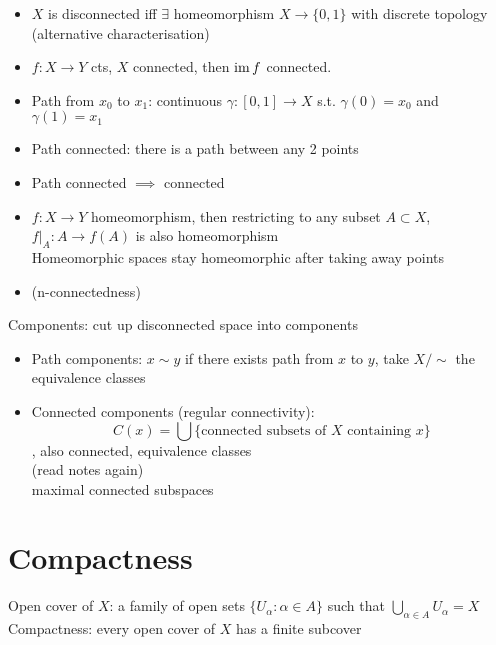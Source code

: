 \begin{itemize}
    \item $X$ is disconnected iff $\exists$ homeomorphism $X \to \{0,1\}$ with discrete topology \\ (alternative characterisation)
    \item $f: X \to Y$ cts, $X$ connected, then $\operatorname{im} f$ connected.
    \item Path from $x_0$ to $x_1$: continuous $\gamma: [0,1] \to X$ s.t. $\gamma(0) = x_0$ and $\gamma(1) = x_1$
    \item Path connected: there is a path between any 2 points
    \item Path connected $\implies$ connected
    \item $f: X \to Y$ homeomorphism, then restricting to any subset $A \subset X$, $f|_A: A \to f(A)$ is also homeomorphism \\ Homeomorphic spaces stay homeomorphic after taking away points
    \item (n-connectedness)
\end{itemize}

Components: cut up disconnected space into components

\begin{itemize}
    \item Path components: $x \sim y$ if there exists path from $x$ to $y$, take $X/\sim$ the equivalence classes
    \item Connected components (regular connectivity): \[C(x) = \bigcup \{ \text{connected subsets of } X \text{ containing } x \} \], also connected, equivalence classes
          \\ (read notes again)
          \\ maximal connected subspaces
\end{itemize}

\section{Compactness}
Open cover of $X$: a family of open sets $\{U_\alpha: \alpha \in A \}$ such that $\bigcup_{\alpha \in A} U_\alpha = X$\\
Compactness: every open cover of $X$ has a finite subcover

